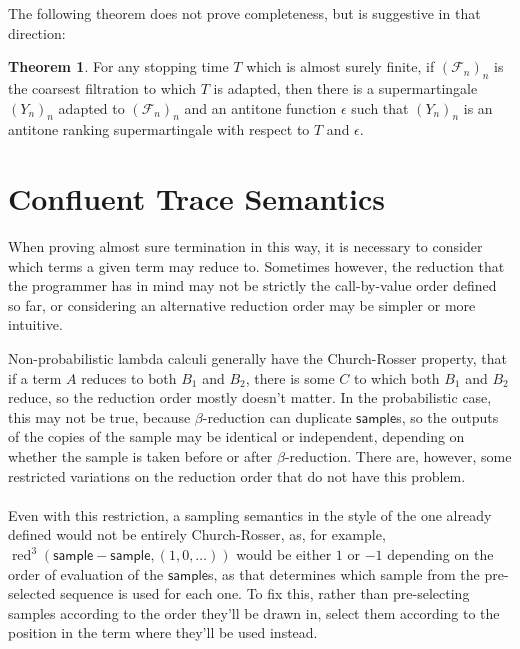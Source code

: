 \documentclass{article}
\newcommand\calF{\mathcal{F}}
\newcommand{\tsample}{\mathsf{sample}}
\DeclareMathOperator{\red}{red}
\theoremstyle{definition}
\theoremstyle{lemma}
\newtheorem{theorem}{Theorem}
\theoremstyle{remark}
\begin{document}
The following theorem does not prove completeness, but is suggestive in that direction:
\begin{theorem}
For any stopping time $T$ which is almost surely finite, if $(\calF_n)_n$ is the coarsest filtration to which $T$ is adapted, then there is a supermartingale $(Y_n)_n$ adapted to $(\calF_n)_n$ and an antitone function $\epsilon$ such that $(Y_n)_n$ is an antitone ranking supermartingale with respect to $T$ and $\epsilon$.
\end{theorem}




\section{Confluent Trace Semantics}
When proving almost sure termination in this way, it is necessary to consider which terms a given term may reduce to. Sometimes however, the reduction that the programmer has in mind may not be strictly the call-by-value order defined so far, or considering an alternative reduction order may be simpler or more intuitive.

Non-probabilistic lambda calculi generally have the Church-Rosser property, that if a term $A$ reduces to both $B_1$ and $B_2$, there is some $C$ 
to which both $B_1$ and $B_2$ reduce,
so the reduction order mostly doesn't matter. 
In the probabilistic case, this may not be true, because $\beta$-reduction can duplicate $\tsample$s, so the outputs of the copies of the sample may be identical or independent, depending on whether the sample is taken before or after $\beta$-reduction. 
There are, however, some restricted variations on the reduction order that do not have this problem.

\paragraph{}
Even with this restriction, a sampling semantics in the style of the one already defined would not be entirely Church-Rosser, as, for example, $\red^3(\tsample - \tsample, (1,0,\dots))$ would be either $1$ or $-1$ depending on the order of evaluation of the $\tsample$s, as that determines which sample from the pre-selected sequence is used for each one. To fix this, rather than pre-selecting samples according to the order they'll be drawn in, select them according to the position in the term where they'll be used instead.
\end{document}

